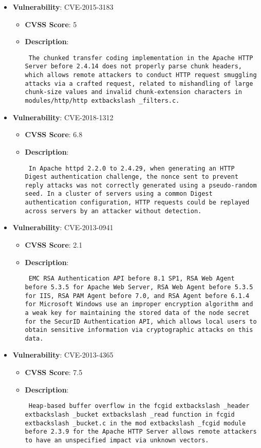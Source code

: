 \documentclass{article}
\begin{document}
\begin{itemize}
        \item \textbf{Vulnerability}: CVE-2015-3183
        \begin{itemize}
            \item \textbf{CVSS Score}:  5 
            \item \textbf{Description}: \parbox{\linewidth}{\texttt{ The chunked transfer coding implementation in the Apache HTTP Server before 2.4.14 does not properly parse chunk headers, which allows remote attackers to conduct HTTP request smuggling attacks via a crafted request, related to mishandling of large chunk-size values and invalid chunk-extension characters in modules/http/http	extbackslash _filters.c. }}
        \end{itemize}
    
        \item \textbf{Vulnerability}: CVE-2018-1312
        \begin{itemize}
            \item \textbf{CVSS Score}:  6.8 
            \item \textbf{Description}: \parbox{\linewidth}{\texttt{ In Apache httpd 2.2.0 to 2.4.29, when generating an HTTP Digest authentication challenge, the nonce sent to prevent reply attacks was not correctly generated using a pseudo-random seed. In a cluster of servers using a common Digest authentication configuration, HTTP requests could be replayed across servers by an attacker without detection. }}
        \end{itemize}
    
        \item \textbf{Vulnerability}: CVE-2013-0941
        \begin{itemize}
            \item \textbf{CVSS Score}:  2.1 
            \item \textbf{Description}: \parbox{\linewidth}{\texttt{ EMC RSA Authentication API before 8.1 SP1, RSA Web Agent before 5.3.5 for Apache Web Server, RSA Web Agent before 5.3.5 for IIS, RSA PAM Agent before 7.0, and RSA Agent before 6.1.4 for Microsoft Windows use an improper encryption algorithm and a weak key for maintaining the stored data of the node secret for the SecurID Authentication API, which allows local users to obtain sensitive information via cryptographic attacks on this data. }}
        \end{itemize}
    
        \item \textbf{Vulnerability}: CVE-2013-4365
        \begin{itemize}
            \item \textbf{CVSS Score}:  7.5 
            \item \textbf{Description}: \parbox{\linewidth}{\texttt{ Heap-based buffer overflow in the fcgid	extbackslash _header	extbackslash _bucket	extbackslash _read function in fcgid	extbackslash _bucket.c in the mod	extbackslash _fcgid module before 2.3.9 for the Apache HTTP Server allows remote attackers to have an unspecified impact via unknown vectors. }}
        \end{itemize}
    

\end{itemize}
\end{document}
